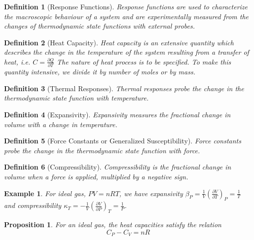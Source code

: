 \documentclass[a4paper]{article}
\newtheorem{eg}{Example}[section]
\theoremstyle{new}
\newtheorem{defi}{Definition}[section]
\newtheorem{prop}{Proposition}[section]
\begin{document}
\begin{defi}[Response Functions]
Response functions are used to characterize the macroscopic behaviour of a system and are experimentally measured from the changes of thermodynamic state functions with external probes.
\end{defi}
\begin{defi}[Heat Capacity]
Heat capacity is an extensive quantity which describes the change in the temperature of the system resulting from a transfer of heat, i.e. $C=\frac{\partial Q}{\partial T}$ The nature of heat process is to be specified. To make this quantity intensive, we divide it by number of moles or by mass.
\end{defi}
\begin{defi}[Thermal Responses]
Thermal responses probe the change in the thermodynamic state function with temperature.
\end{defi}
\begin{defi}[Expansivity]
Expansivity measures the fractional change in volume with a change in temperature.
\end{defi}
\begin{defi}[Force Constants or Generalized Susceptibility]
Force constants probe the change in the thermodynamic state function with force.
\end{defi}
\begin{defi}[Compressibility]
Compressibility is the fractional change in volume when a force is applied, multiplied by a negative sign.
\end{defi}
\begin{eg}
For ideal gas, $PV=nRT$, we have expansivity $\beta_P=\frac{1}{V}(\frac{\partial V}{\partial T})_P=\frac{1}{T}$ and compressibility $\kappa_T=-\frac{1}{V}(\frac{\partial V}{\partial P})_T=\frac{1}{P}$.
\end{eg}
\begin{prop}
For an ideal gas, the heat capacities satisfy the relation
$$C_P-C_V=nR$$
\end{prop}
\end{document}
